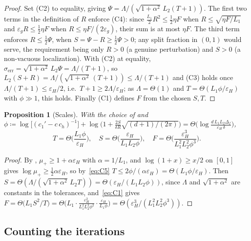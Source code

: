 \documentclass[11pt]{article}
\theoremstyle{plain}
\newtheorem{proposition}{Proposition}[section]
\theoremstyle{definition}
\theoremstyle{remark}
\newcommand{\eps}{\varepsilon}
\newcommand{\epsg}{\eps_{g}}
\newcommand{\epsH}{\eps_{H}}
\newcommand{\mup}{\mu_{+}}
\newcommand{\sg}{\sigma_{\mathrm{err}}}
\begin{document}
\begin{proof}
Set (C2) to equality, giving $\Psi=\Lambda/(\sqrt{1+\alpha^{2}}\,L_{2}(T+1))$.
The first two terms in the definition of $R$ enforce (C4): since
$\tfrac{L_{1}}{2}R^{2}\le\tfrac12\eta F$ when $R\le\sqrt{\eta F/L_{1}}$
and $\epsg R\le\tfrac12\eta F$ when $R\le\eta F/(2\epsg)$, their sum is
at most $\eta F$. The third term enforces $R\le\tfrac12\Psi$, when
$S=\Psi-R\ge\tfrac12\Psi>0$; any split fraction in $(0,1)$ would serve,
the requirement being only $R>0$ (a genuine perturbation) and $S>0$ (a
non-vacuous localization). With (C2) at equality,
$\sg=\sqrt{1+\alpha^{2}}\,L_{2}\Psi=\Lambda/(T+1)$, so
$L_{2}(S+R)=\Lambda/(\sqrt{1+\alpha^{2}}\,(T+1))\le\Lambda/(T+1)$ and (C3)
holds once $\Lambda/(T+1)\le\epsH/2$, i.e.\ $T+1\ge2\Lambda/\epsH$; as
$\Lambda=\Theta(1)$ and $T=\Theta(L_{1}\phi/\epsH)$ with $\phi\gg1$, this
holds. Finally (C1) defines $F$ from the chosen $S,T$.
\end{proof}
 
\begin{proposition}[Scales]
\label{prop:scales}
With the choice of  and
$\phi\coloneqq\log\!\big[(c_{1}'-c\,c_{h})^{-1}\big]
+\log\!\big(1+\tfrac{2S}{\delta R}\sqrt{(d+1)/(2\pi)}\big)
=\Theta\!\big(\log\tfrac{d\,L_{1}L_{2}\Delta_{f}}{\epsH\,\delta}\big)$,
\[
  T=\Theta\!\Big(\frac{L_{1}\phi}{\epsH}\Big),\quad
  S=\Theta\!\Big(\frac{\epsH}{L_{1}L_{2}\phi}\Big),\quad
  F=\Theta\!\Big(\frac{\epsH^{3}}{L_{1}^{2}L_{2}^{2}\phi^{3}}\Big).
\]
\end{proposition}
 
\begin{proof}
By , $\mup\ge1+\alpha\epsH$ with $\alpha=1/L_{1}$,
and $\log(1+x)\ge x/2$ on $[0,1]$ gives
$\log\mup\ge\tfrac12\alpha\epsH$, so by~\eqref{eq:C5}
$T\le2\phi/(\alpha\epsH)=\Theta(L_{1}\phi/\epsH)$. Then
$S=\Theta(\Lambda/(\sqrt{1+\alpha^{2}}\,L_{2}T))=\Theta(\epsH/(L_{1}L_{2}\phi))$,
since $\Lambda$ and $\sqrt{1+\alpha^{2}}$ are constants in the tolerances, and~\eqref{eq:C1} gives
$F=\Theta\!\big(L_{1}S^{2}/T\big)
=\Theta\!\big(L_{1}\cdot\tfrac{\epsH^{2}}{L_{1}^{2}L_{2}^{2}\phi^{2}}
\cdot\tfrac{\epsH}{L_{1}\phi}\big)
=\Theta(\epsH^{3}/(L_{1}^{2}L_{2}^{2}\phi^{3}))$.
\end{proof}
 
\subsection{Counting the iterations}
 
\end{document}
